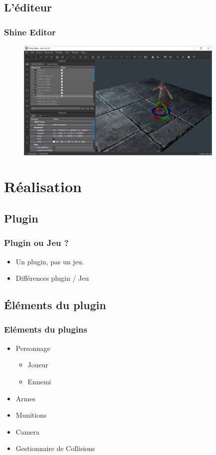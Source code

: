 \documentclass[12pt]{beamer}
\begin{document}
\subsection{L'éditeur}
\begin{frame}
\frametitle{Shine Editor}
\begin{figure}
   \includegraphics[width=10cm]{shine_editor.jpg}
\end{figure}
\end{frame}


\section{Réalisation}
\subsection{Plugin}
\begin{frame}
\frametitle{Plugin ou Jeu ?}
\begin{itemize}
\item
Un plugin, pas un jeu.
\item
Différences plugin / Jeu
\end{itemize}
\end{frame}

\subsection{Éléments du plugin}
\begin{frame}[t]
\frametitle{Eléments du plugins}
\begin{itemize}
\item
Personnage
\begin{itemize}
\item
Joueur
\item
Ennemi
\end{itemize}
\item
Armes
\item
Munitions
\item
Camera
\item
Gestionnaire de Collisions

\end{itemize}

\end{frame}
\end{document}
